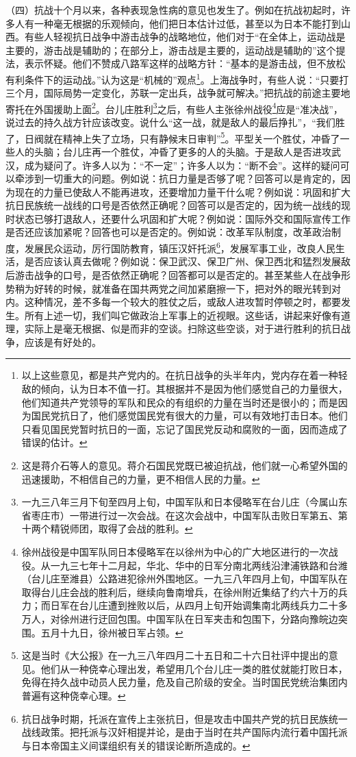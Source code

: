 \documentclass[UTF8, 12pt, a4paper]{ctexrep}
\begin{document}
（四）抗战十个月以来，各种表现急性病的意见也发生了。例如在抗战初起时，许多人有一种毫无根据的乐观倾向，他们把日本估计过低，甚至以为日本不能打到山西。有些人轻视抗日战争中游击战争的战略地位，他们对于“在全体上，运动战是主要的，游击战是辅助的；在部分上，游击战是主要的，运动战是辅助的”这个提法，表示怀疑。他们不赞成八路军这样的战略方针：“基本的是游击战，但不放松有利条件下的运动战。”认为这是“机械的”观点\footnote{以上这些意见，都是共产党内的。在抗日战争的头半年内，党内存在着一种轻敌的倾向，认为日本不值一打。其根据并不是因为他们感觉自己的力量很大，他们知道共产党领导的军队和民众的有组织的力量在当时还是很小的；而是因为国民党抗日了，他们感觉国民党有很大的力量，可以有效地打击日本。他们只看见国民党暂时抗日的一面，忘记了国民党反动和腐败的一面，因而造成了错误的估计。}。上海战争时，有些人说：“只要打三个月，国际局势一定变化，苏联一定出兵，战争就可解决。”把抗战的前途主要地寄托在外国援助上面\footnote{这是蒋介石等人的意见。蒋介石国民党既已被迫抗战，他们就一心希望外国的迅速援助，不相信自己的力量，更不相信人民的力量。}。台儿庄胜利\footnote{一九三八年三月下旬至四月上旬，中国军队和日本侵略军在台儿庄（今属山东省枣庄市）一带进行过一次会战。在这次会战中，中国军队击败日军第五、第十两个精锐师团，取得了会战的胜利。}之后，有些人主张徐州战役\footnote{徐州战役是中国军队同日本侵略军在以徐州为中心的广大地区进行的一次战役。从一九三七年十二月起，华北、华中的日军分南北两线沿津浦铁路和台潍（台儿庄至潍县）公路进犯徐州外围地区。一九三八年四月上旬，中国军队在取得台儿庄会战的胜利后，继续向鲁南增兵，在徐州附近集结了约六十万的兵力；而日军在台儿庄遭到挫败以后，从四月上旬开始调集南北两线兵力二十多万人，对徐州进行迂回包围。中国军队在日军夹击和包围下，分路向豫皖边突围。五月十九日，徐州被日军占领。}应是“准决战”，说过去的持久战方针应该改变。说什么“这一战，就是敌人的最后挣扎”，“我们胜了，日阀就在精神上失了立场，只有静候末日审判”\footnote{这是当时《大公报》在一九三八年四月二十五日和二十六日社评中提出的意见。他们从一种侥幸心理出发，希望用几个台儿庄一类的胜仗就能打败日本，免得在持久战中动员人民力量，危及自己阶级的安全。当时国民党统治集团内普遍有这种侥幸心理。}。平型关一个胜仗，冲昏了一些人的头脑；台儿庄再一个胜仗，冲昏了更多的人的头脑。于是敌人是否进攻武汉，成为疑问了。许多人以为：“不一定”；许多人以为：“断不会”。这样的疑问可以牵涉到一切重大的问题。例如说：抗日力量是否够了呢？回答可以是肯定的，因为现在的力量已使敌人不能再进攻，还要增加力量干什么呢？例如说：巩固和扩大抗日民族统一战线的口号是否依然正确呢？回答可以是否定的，因为统一战线的现时状态已够打退敌人，还要什么巩固和扩大呢？例如说：国际外交和国际宣传工作是否还应该加紧呢？回答也可以是否定的。例如说：改革军队制度，改革政治制度，发展民众运动，厉行国防教育，镇压汉奸托派\footnote{抗日战争时期，托派在宣传上主张抗日，但是攻击中国共产党的抗日民族统一战线政策。把托派与汉奸相提并论，是由于当时在共产国际内流行着中国托派与日本帝国主义间谍组织有关的错误论断所造成的。}，发展军事工业，改良人民生活，是否应该认真去做呢？例如说：保卫武汉、保卫广州、保卫西北和猛烈发展敌后游击战争的口号，是否依然正确呢？回答都可以是否定的。甚至某些人在战争形势稍为好转的时候，就准备在国共两党之间加紧磨擦一下，把对外的眼光转到对内。这种情况，差不多每一个较大的胜仗之后，或敌人进攻暂时停顿之时，都要发生。所有上述一切，我们叫它做政治上军事上的近视眼。这些话，讲起来好像有道理，实际上是毫无根据、似是而非的空谈。扫除这些空谈，对于进行胜利的抗日战争，应该是有好处的。
\end{document}
